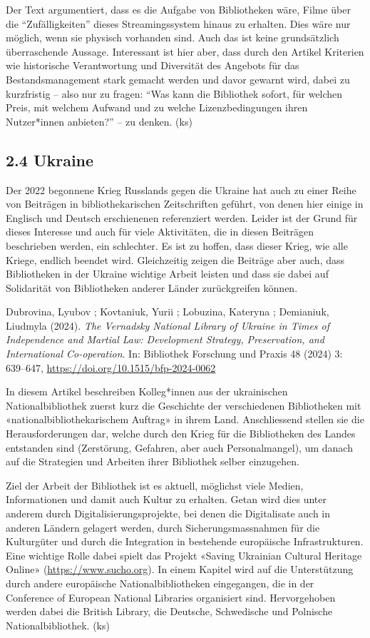 \documentclass[a4paper,
fontsize=11pt,
oneside,
numbers=noperiodatend,
parskip=half-,
bibliography=totoc,
final
]{scrartcl}
\begin{document}
Der Text argumentiert, dass es die Aufgabe von Bibliotheken wäre, Filme
über die \enquote{Zufälligkeiten} dieses Streamingssystem hinaus zu
erhalten. Dies wäre nur möglich, wenn sie physisch vorhanden sind. Auch
das ist keine grundsätzlich überraschende Aussage. Interessant ist hier
aber, dass durch den Artikel Kriterien wie historische Verantwortung und
Diversität des Angebots für das Bestandsmanagement stark gemacht werden
und davor gewarnt wird, dabei zu kurzfristig -- also nur zu fragen:
\enquote{Was kann die Bibliothek sofort, für welchen Preis, mit welchem
Aufwand und zu welche Lizenzbedingungen ihren Nutzer*innen anbieten?} --
zu denken. (ks)

\subsection{2.4 Ukraine}\label{ukraine}

Der 2022 begonnene Krieg Russlands gegen die Ukraine hat auch zu einer
Reihe von Beiträgen in bibliothekarischen Zeitschriften geführt, von
denen hier einige in Englisch und Deutsch erschienenen referenziert
werden. Leider ist der Grund für dieses Interesse und auch für viele
Aktivitäten, die in diesen Beiträgen beschrieben werden, ein schlechter.
Es ist zu hoffen, dass dieser Krieg, wie alle Kriege, endlich beendet
wird. Gleichzeitig zeigen die Beiträge aber auch, dass Bibliotheken in
der Ukraine wichtige Arbeit leisten und dass sie dabei auf Solidarität
von Bibliotheken anderer Länder zurückgreifen können.

Dubrovina, Lyubov ; Kovtaniuk, Yurii ; Lobuzina, Kateryna ; Demianiuk,
Liudmyla (2024). \emph{The Vernadsky National Library of Ukraine in
Times of Independence and Martial Law: Development Strategy,
Preservation, and International Co-operation}. In: Bibliothek Forschung
und Praxis 48 (2024) 3: 639--647,
\url{https://doi.org/10.1515/bfp-2024-0062}

In diesem Artikel beschreiben Kolleg*innen aus der ukrainischen
Nationalbibliothek zuerst kurz die Geschichte der verschiedenen
Bibliotheken mit «nationalbibliothekarischem Auftrag» in ihrem Land.
Anschliessend stellen sie die Herausforderungen dar, welche durch den
Krieg für die Bibliotheken des Landes entstanden sind (Zerstörung,
Gefahren, aber auch Personalmangel), um danach auf die Strategien und
Arbeiten ihrer Bibliothek selber einzugehen.

Ziel der Arbeit der Bibliothek ist es aktuell, möglichst viele Medien,
Informationen und damit auch Kultur zu erhalten. Getan wird dies unter
anderem durch Digitalisierungsprojekte, bei denen die Digitalisate auch
in anderen Ländern gelagert werden, durch Sicherungsmassnahmen für die
Kulturgüter und durch die Integration in bestehende europäische
Infrastrukturen. Eine wichtige Rolle dabei spielt das Projekt «Saving
Ukrainian Cultural Heritage Online» (\url{https://www.sucho.org}). In
einem Kapitel wird auf die Unterstützung durch andere europäische
Nationalbibliotheken eingegangen, die in der Conference of European
National Libraries organisiert sind. Hervorgehoben werden dabei die
British Library, die Deutsche, Schwedische und Polnische
Nationalbibliothek. (ks)
\end{document}
